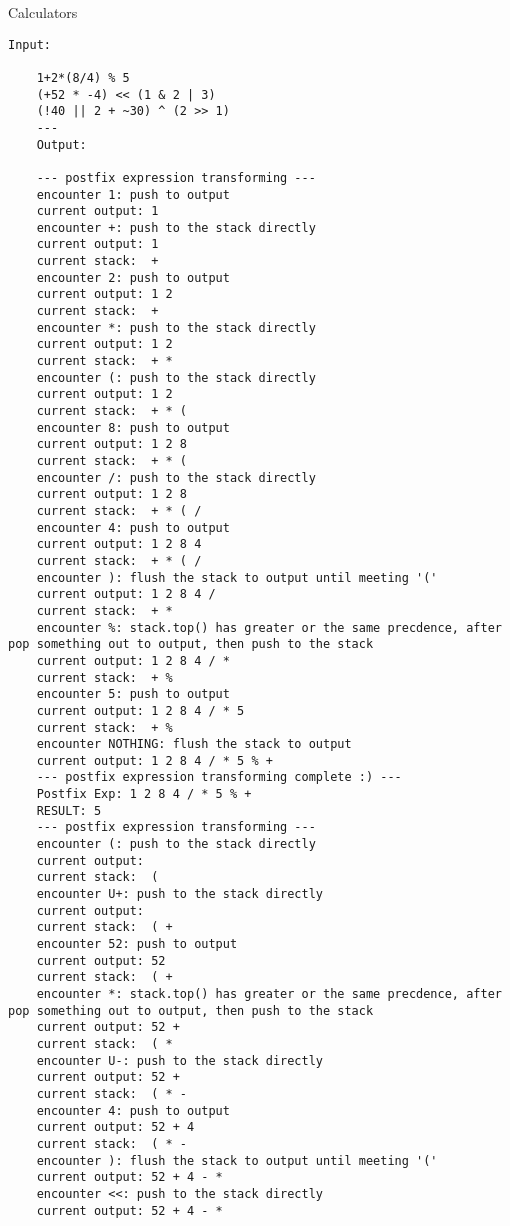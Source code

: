 \pagebreak

\begin{homeworkProblem}{Calculators}

    \begin{lstlisting}[breaklines=true]
    Input:

    1+2*(8/4) % 5
    (+52 * -4) << (1 & 2 | 3) 
    (!40 || 2 + ~30) ^ (2 >> 1)
    ---
    Output:

    --- postfix expression transforming ---
    encounter 1: push to output
    current output: 1
    encounter +: push to the stack directly
    current output: 1
    current stack:  +
    encounter 2: push to output
    current output: 1 2
    current stack:  +
    encounter *: push to the stack directly
    current output: 1 2
    current stack:  + *
    encounter (: push to the stack directly
    current output: 1 2
    current stack:  + * (
    encounter 8: push to output
    current output: 1 2 8
    current stack:  + * (
    encounter /: push to the stack directly
    current output: 1 2 8
    current stack:  + * ( /
    encounter 4: push to output
    current output: 1 2 8 4
    current stack:  + * ( /
    encounter ): flush the stack to output until meeting '('
    current output: 1 2 8 4 /
    current stack:  + *
    encounter %: stack.top() has greater or the same precdence, after pop something out to output, then push to the stack
    current output: 1 2 8 4 / *
    current stack:  + %
    encounter 5: push to output
    current output: 1 2 8 4 / * 5
    current stack:  + %
    encounter NOTHING: flush the stack to output
    current output: 1 2 8 4 / * 5 % +
    --- postfix expression transforming complete :) ---
    Postfix Exp: 1 2 8 4 / * 5 % +
    RESULT: 5
    --- postfix expression transforming ---
    encounter (: push to the stack directly
    current output:
    current stack:  (
    encounter U+: push to the stack directly
    current output:
    current stack:  ( +
    encounter 52: push to output
    current output: 52
    current stack:  ( +
    encounter *: stack.top() has greater or the same precdence, after pop something out to output, then push to the stack
    current output: 52 +
    current stack:  ( *
    encounter U-: push to the stack directly
    current output: 52 +
    current stack:  ( * -
    encounter 4: push to output
    current output: 52 + 4
    current stack:  ( * -
    encounter ): flush the stack to output until meeting '('
    current output: 52 + 4 - *
    encounter <<: push to the stack directly
    current output: 52 + 4 - *

\end{lstlisting}
\end{homeworkProblem}
